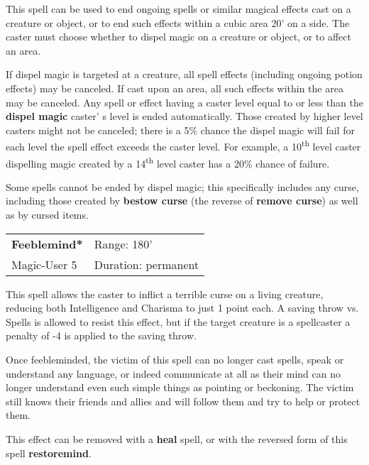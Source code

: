 \documentclass[a4paper,twoside,openany,10pt]{book}
\begin{document}
\begin{multicols}{2}
This spell can be used to end ongoing spells or similar magical effects cast on a creature or object, or to end such effects within a cubic area 20' on a side. The caster must choose whether to dispel magic on a creature or object, or to affect an area.

If dispel magic is targeted at a creature, all spell effects (including ongoing potion effects) may be canceled. If cast upon an area, all such effects within the area may be canceled. Any spell or effect having a caster level equal to or less than the \textbf{dispel magic} caster' s level is ended automatically. Those created by higher level casters might not be canceled; there is a 5\% chance the dispel magic will fail for each level the spell effect exceeds the caster level. For example, a 10\textsuperscript{th} level caster dispelling magic created by a 14\textsuperscript{th} level caster has a 20\% chance of failure.

Some spells cannot be ended by dispel magic; this specifically includes any curse, including those created by \textbf{bestow curse} (the reverse of \textbf{remove curse}) as well as by cursed items.



\smallskip\begin{flushleft} 
	\begin{tabularx}{0.45\textwidth}{@{}m{3.5cm}m{5.5cm}@{}} 
		\textbf{Feeblemind*} & Range: 180'\\
		Magic-User 5 &Duration: permanent\\
	\end{tabularx}\end{flushleft}

This spell allows the caster to inflict a terrible curse on a living creature, reducing both Intelligence and Charisma to just 1 point each. A saving throw vs. Spells is allowed to resist this effect, but if the target creature is a spellcaster a penalty of -4 is applied to the saving throw.

Once feebleminded, the victim of this spell can no longer cast spells, speak or understand any language, or indeed communicate at all as their mind can no longer understand even such simple things as pointing or beckoning. The victim still knows their friends and allies and will follow them and try to help or protect them.

This effect can be removed with a \textbf{heal} spell, or with the reversed form of this spell \textbf{restoremind}.



\end{multicols}
\end{document}
